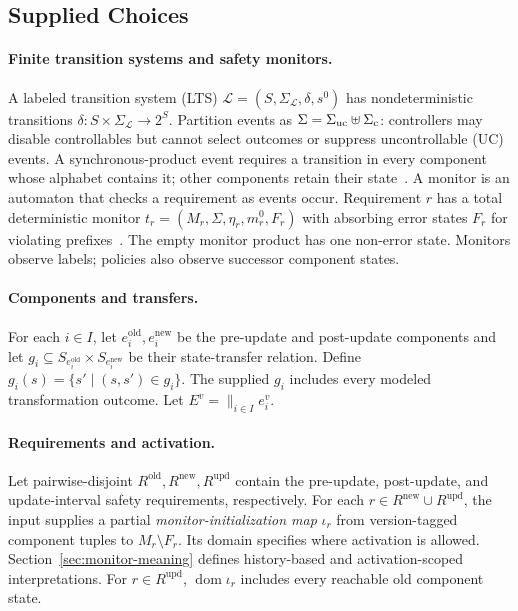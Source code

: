 \subsection{Supplied Choices}

\paragraph{Finite transition systems and safety monitors.}
A labeled transition system (LTS) $\mathcal L=(S,\Sigma_{\mathcal L},\delta,s^0)$ has nondeterministic transitions $\delta:S\times\Sigma_{\mathcal L}\to2^S$. Partition events as $\Sigma=\Sigma_{\mathrm{uc}}\uplus\Sigma_{\mathrm{c}}$: controllers may disable controllables but cannot select outcomes or suppress uncontrollable (UC) events. A synchronous-product event requires a transition in every component whose alphabet contains it; other components retain their state~\cite{MageeKramer2006}.
A monitor is an automaton that checks a requirement as events occur. Requirement $r$ has a total deterministic monitor $t_r=(M_r,\Sigma,\eta_r,m_r^0,F_r)$ with absorbing error states $F_r$ for violating prefixes~\cite{AlpernSchneider1985,KupfermanVardi2001}. The empty monitor product has one non-error state. Monitors observe labels; policies also observe successor component states.

\label{def:fg-inputs}
\label{def:update_plan}
\paragraph{Components and transfers.}
For each $i\in I$, let $e_i^{\mathrm{old}},e_i^{\mathrm{new}}$ be the pre-update and post-update components and let $g_i\subseteq S_{e_i^{\mathrm{old}}}\times S_{e_i^{\mathrm{new}}}$ be their state-transfer relation.
  Define $g_i(s)=\{s'\mid(s,s')\in g_i\}$. The supplied $g_i$ includes every modeled transformation outcome. Let $E^v=\mathop{\parallel}_{i\in I}e_i^v$.

\paragraph{Requirements and activation.}
Let pairwise-disjoint $R^{\mathrm{old}},R^{\mathrm{new}},R^{\mathrm{upd}}$ contain the pre-update, post-update, and update-interval safety requirements, respectively.
For each $r\in R^{\mathrm{new}}\cup R^{\mathrm{upd}}$, the input supplies a partial \emph{monitor-initialization map} $\iota_r$ from version-tagged component tuples to $M_r\setminus F_r$. Its domain specifies where activation is allowed.
Section~\ref{sec:monitor-meaning} defines history-based and activation-scoped interpretations. For $r\in R^{\mathrm{upd}}$, $\operatorname{dom}\iota_r$ includes every reachable old component state.

